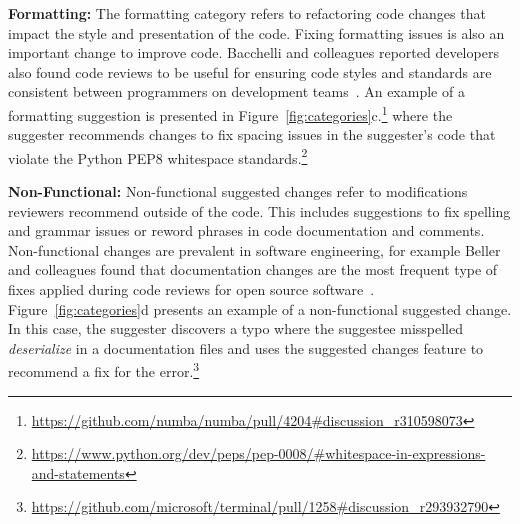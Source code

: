 \textbf{Formatting:} The formatting category refers to refactoring code changes that impact the style and presentation of the code. Fixing formatting issues is also an important change to improve code. Bacchelli and colleagues reported developers also found code reviews to be useful for ensuring code styles and standards are consistent between programmers on development teams~\cite{bacchelli2013codereview}. An example of a formatting suggestion is presented in Figure~\ref{fig:categories}c.\footnote{\url{https://github.com/numba/numba/pull/4204\#discussion_r310598073}} where the suggester recommends changes to fix spacing issues in the suggester's code that violate the Python PEP8 whitespace standards.\footnote{\url{https://www.python.org/dev/peps/pep-0008/\#whitespace-in-expressions-and-statements}}

\textbf{Non-Functional:} Non-functional suggested changes refer to modifications reviewers recommend outside of the code. This includes suggestions to fix spelling and grammar issues or reword phrases in code documentation and comments. Non-functional changes are prevalent in software engineering, for example Beller and colleagues found that documentation changes are the most frequent type of fixes applied during code reviews for open source software~\cite{beller2014modern}. Figure~\ref{fig:categories}d presents an example of a non-functional suggested change. In this case, the suggester discovers a typo where the suggestee misspelled \textit{deserialize} in a documentation files and uses the suggested changes feature to recommend a fix for the error.\footnote{\url{https://github.com/microsoft/terminal/pull/1258\#discussion_r293932790}}

